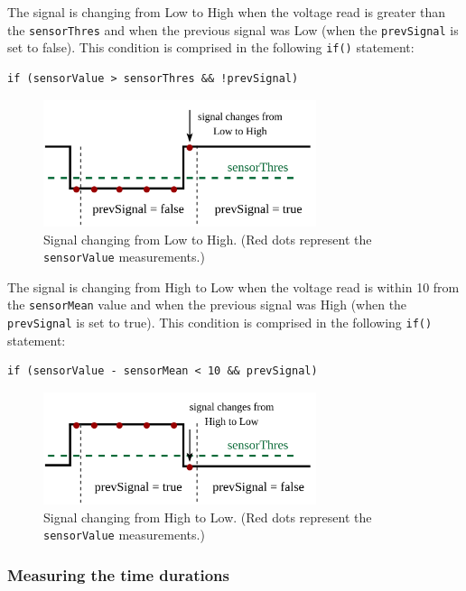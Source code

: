 \documentclass[12pt]{report}
\begin{document}
The signal is changing from Low to High when the voltage read is greater than the \verb|sensorThres| and when the previous signal was Low (when the \verb|prevSignal| is set to false). This condition is comprised in the following \verb|if()| statement:

\begin{lstlisting}
if (sensorValue > sensorThres && !prevSignal)
\end{lstlisting}

\begin{figure}[H]
\centering\includegraphics[width=8cm]{lowtohigh}
\caption{Signal changing from Low to High. (Red dots represent the \texttt{sensorValue} measurements.)}				
\label{fig:arduino_code}
\end{figure}

The signal is changing from High to Low when the voltage read is within 10 from the \verb|sensorMean| value and when the previous signal was High (when the \verb|prevSignal| is set to true). This condition is comprised in the following \verb|if()| statement:

\begin{lstlisting}
if (sensorValue - sensorMean < 10 && prevSignal)
\end{lstlisting}

\begin{figure}[H]
\centering\includegraphics[width=8cm]{hightolow}
\caption{Signal changing from High to Low. (Red dots represent the \texttt{sensorValue} measurements.)}				
\label{fig:arduino_code}
\end{figure}

\subsubsection{Measuring the time durations}
\end{document}
